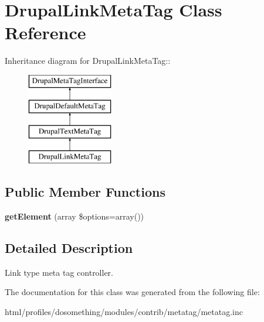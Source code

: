 \hypertarget{classDrupalLinkMetaTag}{
\section{DrupalLinkMetaTag Class Reference}
\label{classDrupalLinkMetaTag}
}
Inheritance diagram for DrupalLinkMetaTag::\begin{figure}[H]
\begin{center}
\leavevmode
\includegraphics[height=4cm]{classDrupalLinkMetaTag}
\end{center}
\end{figure}
\subsection*{Public Member Functions}
\begin{DoxyCompactItemize}
\item 
\hypertarget{classDrupalLinkMetaTag_ad1cbe164b85d940a3fe532d544448b1c}{
{\bfseries getElement} (array \$options=array())}
\label{classDrupalLinkMetaTag_ad1cbe164b85d940a3fe532d544448b1c}

\end{DoxyCompactItemize}


\subsection{Detailed Description}
Link type meta tag controller. 

The documentation for this class was generated from the following file:\begin{DoxyCompactItemize}
\item 
html/profiles/dosomething/modules/contrib/metatag/metatag.inc\end{DoxyCompactItemize}
